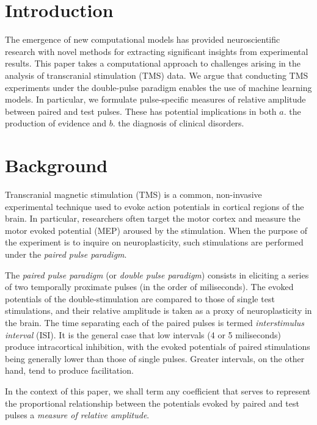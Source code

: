 \documentclass{article}
\begin{document}
 

\begin{multicols}{2}

\section{Introduction}

The emergence of new computational models has provided neuroscientific research
with novel methods for extracting significant insights from experimental results.
This paper takes a computational approach to challenges arising in the analysis
of transcranial stimulation (TMS) data. We argue that conducting TMS experiments
under the double-pulse paradigm enables the use of machine learning models. In
particular, we formulate pulse-specific measures of relative amplitude between
paired and test pulses. These has potential implications in both $a.$ the
production of evidence and $b$. the diagnosis of clinical disorders.

\section{Background}

Transcranial magnetic stimulation (TMS) is a common,
non-invasive experimental technique used to evoke action
potentials in cortical regions of the brain. In particular,
researchers often target the motor cortex and measure the
motor evoked potential (MEP) aroused by the stimulation.
When the purpose of the experiment is to inquire on
neuroplasticity, such stimulations are performed under the
\textit{paired pulse paradigm}.

The \textit{paired pulse paradigm} (or \textit{double pulse
paradigm}) consists in eliciting a series of two temporally
proximate pulses (in the order of miliseconds). The evoked
potentials of the double-stimulation are compared to those
of single test stimulations, and their relative amplitude is
taken as a proxy of neuroplasticity in the brain. The time
separating each of the paired pulses is termed
\textit{interstimulus interval} (ISI). It is the general
case that low intervals (4 or 5 miliseconds) produce
intracortical inhibition, with the evoked potentials of
paired stimulations being generally lower than those of
single pulses. Greater intervals, on the other hand, tend to
produce facilitation. 


In the context of this paper, we shall term any coefficient
that serves to represent the proportional relationship
between the potentials evoked by paired and test pulses a
\textit{measure of relative amplitude}. 



\end{multicols}
\end{document}
